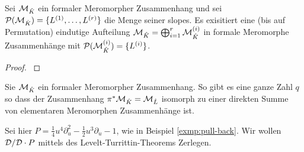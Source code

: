 \begin{thm}
  \cite[Thm 5.3.1]{sabbah_cimpa90}
  Sei $\mathcal{M}_{\hat{K}}$ ein formaler Meromorpher Zusammenhang und sei
  $\mathcal{P}(\mathcal{M}_{\hat K})=\{L^{(1)},\dots,L^{(r)}\}$ die Menge seiner slopes. Es
  exisitiert eine (bis auf Permutation) eindutige Aufteilung $\mathcal{M}_{\hat
  K}=\bigoplus_{i=1}^r\mathcal{M}_{\hat K}^{(i)}$ in formale Meromorphe Zusammenhänge
  mit $\mathcal{P}(\mathcal{M}_{\hat K}^{(i)})=\{L^{(i)}\}$.
\end{thm}
\begin{proof}
  \cite[Thm 5.3.1]{sabbah_cimpa90}
\end{proof}
\begin{comment}
  Aussagen, die aus dem Beweis entstehen:\\
  Wir erhalten die Exacte Sequenz
  \[
    0 \rightarrow \cD_{\hat K}/\cD_{\hat K} \cdot P_1
      \rightarrow \cD_{\hat K}/\cD_{\hat K} \cdot P
      \rightarrow \cD_{\hat K}/\cD_{\hat K} \cdot P_2
      \rightarrow 0
  \]
  \begin{cor}
    \cite[Thm 5.3.4]{sabbah_cimpa90}
    $\cP(P)=\cP(P_1)\cup\cP(P_2)$ und $\cP(P_1)\cap\cP(P_2)=\emptyset$
  \end{cor}
\end{comment}
\begin{comment}
  \cite[Page 34]{sabbah_cimpa90}
  Sei $\cM_{\hat K}$ ein formaler Meromorpher Zusammenhang. Man definiert
  $\pi^*\cM_{\hat K}$ als den Vektor Raum über $\hat L:\pi^*\cM_{\hat K}=\hat
  L\otimes_{\hat K}\cM_{\hat K}$. Dann definiert man die Wirkung von
  $\partial_t$ durch: $t\partial_t\cdot(1\otimes
  m)=q(1\otimes(x\partial_x\otimes m))$ und damit
  \[
    t\partial_t\cdot(\phi\otimes m)=q(\phi\otimes(x\partial_x\cdot
    m))+((t\frac{\partial\phi}{\partial t})\otimes m) \,.
  \]
\end{comment}
\begin{thm}
  \cite[Thm 5.4.7]{sabbah_cimpa90}
  Sie $\mathcal{M}_{\hat K}$ ein formaler Meromorpher Zusammenhang. So gibt es eine
  ganze Zahl $q$ so dass der Zusammenhang $\pi^*\mathcal{M}_{\hat K}=\mathcal{M}_{\hat L}$
  isomorph zu einer direkten Summe von elementaren Meromorphen Zusammenhänge
  ist.
\end{thm}

\begin{exmp}
  Sei hier $P=\frac{1}{4}u^4\partial_u^2-\frac{1}{2}u^3\partial_u-1$, wie in
  Beispiel \ref{exmp:pull-back}.
  Wir wollen $\mathcal{D}/\mathcal{D}\cdot P$ mittels des Levelt-Turrittin-Theorems Zerlegen.
\end{exmp}

